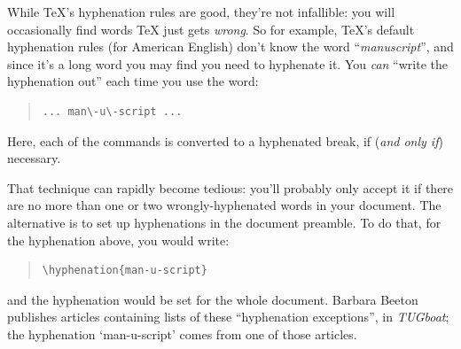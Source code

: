 
While \TeX{}'s hyphenation rules are good, they're not infallible: you
will occasionally find words \TeX{} just gets \emph{wrong}.  So for
example, \TeX{}'s default hyphenation rules (for American English) don't
know the word ``\emph{manuscript}'', and since it's a long word you
may find you need to hyphenate it.  You \emph{can} ``write the
hyphenation out'' each time you use the word:
\begin{quote}
\begin{verbatim}
... man\-u\-script ...
\end{verbatim}
\end{quote}
Here, each of the \csx{-} commands is converted to a hyphenated break,
if (\emph{and only if}) necessary.

That technique can rapidly become tedious: you'll probably only accept
it if there are no more than one or two wrongly-hyphenated words in
your document.  The alternative is to set up hyphenations in the
document preamble.  To do that, for the hyphenation above, you would
write:
\begin{quote}
\begin{verbatim}
\hyphenation{man-u-script}
\end{verbatim}
\end{quote}
and the hyphenation would be set for the whole document.  Barbara
Beeton publishes articles containing lists of these ``hyphenation
exceptions'', in \textsl{TUGboat}; the hyphenation `man-u-script'
comes from one of those articles.

